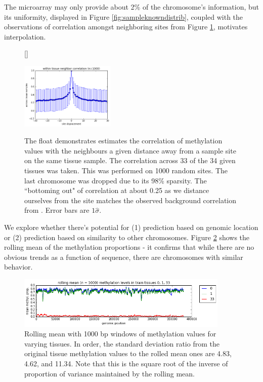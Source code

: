 \documentclass{article} %
\begin{document}
The microarray may only provide about 2\% of the chromosome's information, but its uniformity, displayed in Figure \ref{fig:sampleknowndistrib}, coupled with the observations of correlation amongst neighboring sites from Figure \ref{fig:colocalsite}, motivates interpolation.

\begin{figure}[H]
    \centering
{}[\FBwidth]
{\caption{The float demonstrates estimates the correlation of methylation values with the neighbours a given distance away from a sample site on the same tissue sample. The correlation across 33 of the 34 given tissues was taken. This was performed on 1000 random sites. The last chromosome was dropped due to its 98\% sparsity. The ``bottoming out" of correlation at about 0.25 as we distance ourselves from the site matches the observed background correlation from \cite{zhang2015predicting}. Error bars are $1\hat{\sigma}$.}
    \label{fig:colocalsite}}
{\includegraphics[width=0.4\textwidth]{colocalisitecorr.png}}
\end{figure}

We explore whether there's potential for (1) prediction based on genomic location or (2) prediction based on similarity to other chromosomes. Figure \ref{fig:genomictrends} shows the rolling mean of the methylation proportions - it confirms that while there are no obvious trends as a function of sequence, there are chromosomes with similar behavior.

\begin{figure}[H]
    \centering
    \includegraphics[width=0.9\textwidth]{genomictrends.png}
    \caption{Rolling mean with 1000 bp windows of methylation values for varying tissues. In order, the standard deviation ratio from the original tissue methylation values to the rolled mean ones are 4.83, 4.62, and 11.34. Note that this is the square root of the inverse of proportion of variance maintained by the rolling mean.}
    \label{fig:genomictrends}
\end{figure}
\end{document}
